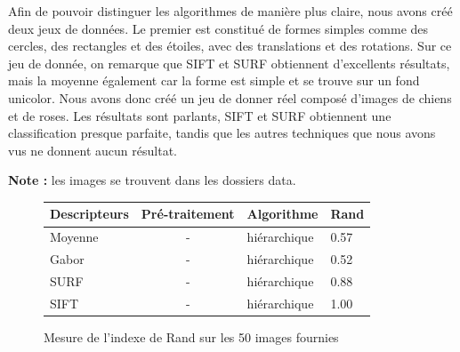 \documentclass[12pt,a4paper,utf8x]{report}
\begin{document}
  Afin de pouvoir distinguer les algorithmes de manière plus claire, nous avons créé deux jeux de données. Le premier est constitué de formes simples comme des cercles, des rectangles et des étoiles, avec des translations et des rotations. Sur ce jeu de donnée, on remarque que SIFT et SURF obtiennent d'excellents résultats, mais la moyenne également car la forme est simple et se trouve sur un fond unicolor. Nous avons donc créé un jeu de donner réel composé d'images de chiens et de roses. Les résultats sont parlants, SIFT et SURF obtiennent une classification presque parfaite, tandis que les autres techniques que nous avons vus ne donnent aucun résultat.

  \textbf{Note : } les images se trouvent dans les dossiers data.

  \begin{figure}[!h]
      \centering
        \begin{tabular}{ | l | c | l | l |}
          \hline
          Descripteurs & Pré-traitement & Algorithme & Rand\\
          \hline
            Moyenne & -             & hiérarchique          & 0.57\\
            Gabor   & -             & hiérarchique          & 0.52\\
            SURF    & -             & hiérarchique          & 0.88\\
            SIFT    & -             & hiérarchique          & 1.00\\
          \hline  
        \end{tabular}
    \caption{Mesure de l'indexe de Rand sur les 50 images fournies}
  \end{figure}

  
\end{document}
